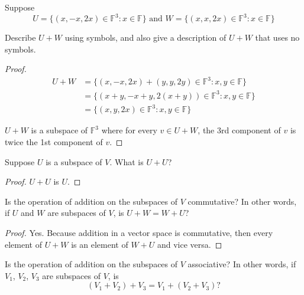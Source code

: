 \begin{exercise}
    Suppose
    \[
        U = \{ (x, -x, 2x)\in \mathbb{F}^{3}: x\in\mathbb{F} \}\text{ and } W = \{ (x, x, 2x)\in \mathbb{F}^{3}: x\in\mathbb{F} \}
    \]

    Describe $U + W$ using symbols, and also give a description of $U + W$ that uses no symbols.
\end{exercise}

\begin{proof}
    \begin{align*}
        U + W & = \{ (x, -x, 2x) + (y, y, 2y)\in \mathbb{F}^{3}: x, y\in\mathbb{F} \} \\
              & = \{ (x+y, -x+y, 2(x+y))\in \mathbb{F}^{3}: x, y\in\mathbb{F} \}      \\
              & = \{ (x, y, 2x)\in\mathbb{F}^{3}: x, y\in\mathbb{F} \}
    \end{align*}

    $U + W$ is a subspace of $\mathbb{F}^{3}$ where for every $v\in U + W$, the 3rd component of $v$ is twice the 1st component of $v$.
\end{proof}

\begin{exercise}
    Suppose $U$ is a subspace of $V$. What is $U + U$?
\end{exercise}

\begin{proof}
    $U + U$ is $U$.
\end{proof}

\begin{exercise}
    Is the operation of addition on the subspaces of $V$ commutative? In other words, if $U$ and $W$ are subspaces of $V$, is $U + W = W + U$?
\end{exercise}

\begin{proof}
    Yes. Because addition in a vector space is commutative, then every element of $U + W$ is an element of $W + U$ and vice versa.
\end{proof}

\begin{exercise}
    Is the operation of addition on the subspaces of $V$ associative? In other words, if $V_{1}$, $V_{2}$, $V_{3}$ are subspaces of $V$, is
    \[
        (V_{1} + V_{2}) + V_{3} = V_{1} + (V_{2} + V_{3})?
    \]
\end{exercise}

